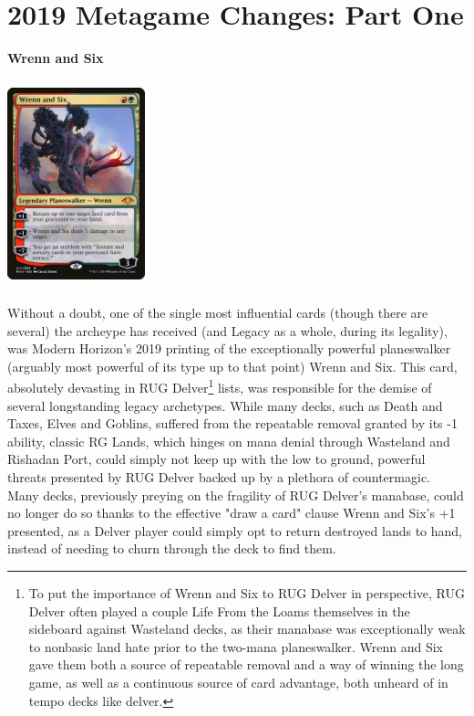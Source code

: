 \documentclass{report}
\begin{document}
\chapter{2019 Metagame Changes: Part One}
\textbf{Wrenn and Six\\}
\begin{center}
\includegraphics [width = 4cm, height = 6cm] {wrenn-and-six}
\end{center}
Without a doubt, one of the single most influential cards (though there are several) the archeype has received (and Legacy as a whole, during its legality), was Modern Horizon's 2019 printing of the exceptionally powerful planeswalker (arguably most powerful of its type up to that point) Wrenn and Six.
This card, absolutely devasting in RUG Delver\footnote{To put the importance of Wrenn and Six to RUG Delver in perspective, RUG Delver often played a couple Life From the Loams themselves in the sideboard against Wasteland decks, as their manabase was exceptionally weak to nonbasic land hate prior to the two-mana planeswalker. Wrenn and Six gave them both a source of repeatable removal and a way of winning the long game, as well as a continuous source of card advantage, both unheard of in tempo decks like delver.}  lists, was responsible for the demise of several longstanding legacy archetypes. While many decks, such as Death and Taxes, Elves and Goblins, suffered from the repeatable removal granted by its -1 ability, classic RG Lands, which hinges on mana denial through Wasteland and Rishadan Port, could simply not keep up with the low to ground, powerful threats presented by RUG Delver backed up by a plethora of countermagic.\\ 
Many decks, previously preying on the fragility of RUG Delver's manabase, could no longer do so thanks to the effective "draw a card" clause Wrenn and Six's +1 presented, as a Delver player could simply opt to return destroyed lands to hand, instead of needing to churn through the deck to find them.\\
\end{document}
